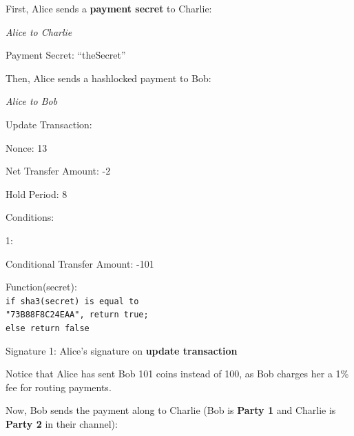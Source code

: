 \documentclass[a4paper]{article}
\newcommand{\bgls}[1]{\textbf{\gls{#1}}}
\newenvironment{mydescription}
{\begin{description}
  \setlength{\itemsep}{5pt}
    \setlength{\parskip}{0pt}
    \setlength{\labelsep}{5pt}
}{
\end{description}}
\begin{document}
First, Alice sends a \bgls{payment secret} to Charlie:

\begin{mdframed}[style=message]{\emph{Alice to Charlie}}
\begin{mydescription}
  \item[Payment Secret:] ``theSecret''
\end{mydescription}
\end{mdframed}

Then, Alice sends a hashlocked payment to Bob:

\begin{mdframed}[style=message]{\emph{Alice to Bob}}
\begin{mydescription}
  \item[Update Transaction:] \hfill
  \begin{mydescription}
    \item[Nonce:] 13
    \item[Net Transfer Amount:] -2
    \item[Hold Period:] 8
    \item[Conditions:] \hfill
    \begin{mydescription}
      \item[1:] \hfill
      \begin{mydescription}
        \item[Conditional Transfer Amount:] -101
        \item[Function(secret):] \texttt{\\ if sha3(secret) is equal to\\ "73B88F8C24EAA", return true;\\ else return false}
      \end{mydescription}
    \end{mydescription}
  \end{mydescription}
  \item[Signature 1:] Alice's signature on \bgls{update transaction}
\end{mydescription}
\end{mdframed}

Notice that Alice has sent Bob 101 coins instead of 100, as Bob charges her a 1\% fee for routing payments.

Now, Bob sends the payment along to Charlie (Bob is \textbf{Party 1} and Charlie is \textbf{Party 2} in their channel):
\end{document}

